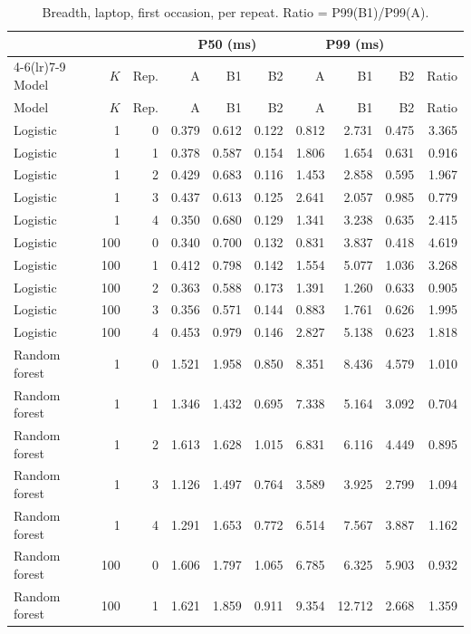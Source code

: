 \documentclass[10pt,a4paper]{article}
\begin{document}
\begin{longtable}{lrrrrrrrrr}
\caption{Breadth, laptop, first occasion, per repeat. Ratio = P99(B1)/P99(A).}\label{tab:lap_rep}\\
\toprule
 & & & \multicolumn{3}{c}{P50 (ms)} & \multicolumn{3}{c}{P99 (ms)} & \\
\cmidrule(lr){4-6}\cmidrule(lr){7-9}
Model & $K$ & Rep. & A & B1 & B2 & A & B1 & B2 & Ratio \\
\midrule
\endfirsthead
\toprule
Model & $K$ & Rep. & A & B1 & B2 & A & B1 & B2 & Ratio \\
\midrule
\endhead
Logistic & 1 & 0 & 0.379 & 0.612 & 0.122 & 0.812 & 2.731 & 0.475 & 3.365 \\
Logistic & 1 & 1 & 0.378 & 0.587 & 0.154 & 1.806 & 1.654 & 0.631 & 0.916 \\
Logistic & 1 & 2 & 0.429 & 0.683 & 0.116 & 1.453 & 2.858 & 0.595 & 1.967 \\
Logistic & 1 & 3 & 0.437 & 0.613 & 0.125 & 2.641 & 2.057 & 0.985 & 0.779 \\
Logistic & 1 & 4 & 0.350 & 0.680 & 0.129 & 1.341 & 3.238 & 0.635 & 2.415 \\
Logistic & 100 & 0 & 0.340 & 0.700 & 0.132 & 0.831 & 3.837 & 0.418 & 4.619 \\
Logistic & 100 & 1 & 0.412 & 0.798 & 0.142 & 1.554 & 5.077 & 1.036 & 3.268 \\
Logistic & 100 & 2 & 0.363 & 0.588 & 0.173 & 1.391 & 1.260 & 0.633 & 0.905 \\
Logistic & 100 & 3 & 0.356 & 0.571 & 0.144 & 0.883 & 1.761 & 0.626 & 1.995 \\
Logistic & 100 & 4 & 0.453 & 0.979 & 0.146 & 2.827 & 5.138 & 0.623 & 1.818 \\
Random forest & 1 & 0 & 1.521 & 1.958 & 0.850 & 8.351 & 8.436 & 4.579 & 1.010 \\
Random forest & 1 & 1 & 1.346 & 1.432 & 0.695 & 7.338 & 5.164 & 3.092 & 0.704 \\
Random forest & 1 & 2 & 1.613 & 1.628 & 1.015 & 6.831 & 6.116 & 4.449 & 0.895 \\
Random forest & 1 & 3 & 1.126 & 1.497 & 0.764 & 3.589 & 3.925 & 2.799 & 1.094 \\
Random forest & 1 & 4 & 1.291 & 1.653 & 0.772 & 6.514 & 7.567 & 3.887 & 1.162 \\
Random forest & 100 & 0 & 1.606 & 1.797 & 1.065 & 6.785 & 6.325 & 5.903 & 0.932 \\
Random forest & 100 & 1 & 1.621 & 1.859 & 0.911 & 9.354 & 12.712 & 2.668 & 1.359 \\

\end{longtable}
\end{document}
